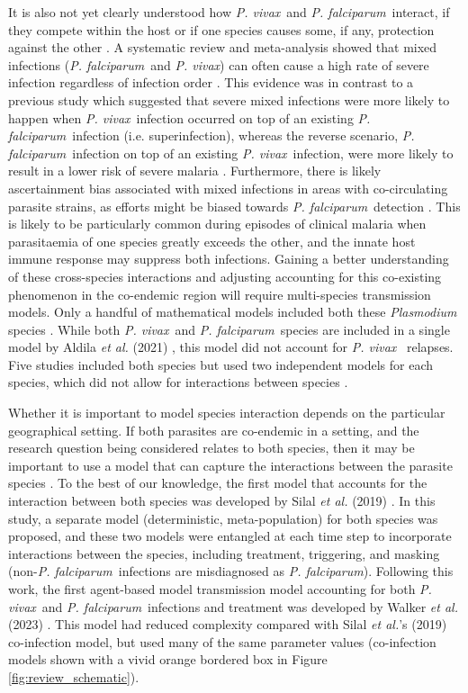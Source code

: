 \documentclass[12pt]{article}
\newcommand{\pv}{\textit{P. vivax}}
\newcommand{\pf}{\textit{P. falciparum}}
\newcommand{\etal}{\textit{et al. }}
\begin{document}
It is also not yet clearly understood how \pv~and \pf~interact, if they compete within the host or if one species causes some, if any, protection against the other \cite{muh2020cross,cox2008knowlesi}.  A systematic review and meta-analysis showed that mixed infections (\pf~and \pv) can often cause a high rate of severe infection regardless of infection order \cite{kotepui2020plasmodium}. This evidence was in contrast to a previous study which suggested that severe mixed infections were more likely to happen when \pv~infection occurred on top of an existing \pf~infection (i.e. superinfection), whereas the reverse scenario, \pf~infection on top of an existing \pv~infection, were more likely to result in a lower risk of severe malaria \cite{mohapatra2012profile}. Furthermore, there is likely ascertainment bias associated with mixed infections in areas with co-circulating parasite strains, as efforts might be biased towards \pf~detection \cite{stresman2020association}. This is likely to be particularly common during episodes of clinical malaria when parasitaemia of one species greatly exceeds the other, and the innate host immune response may suppress both infections. Gaining a better understanding of these cross-species interactions and adjusting accounting for this co-existing phenomenon in the co-endemic region will require multi-species transmission models. Only a handful of mathematical models included both these \textit{Plasmodium} species \cite{pongsumpun2008mathematical,pongsumpun2010impact,aguas2012modeling,pizzitutti2015validated,silal2019malaria,aldila2021superinfection}. While both \pv~and \pf~species are included in a single model by Aldila \etal(2021) \cite{aldila2021superinfection}, this model did not account for \pv~ relapses. Five studies included both species but used two independent models for each species, which did not allow for interactions between species \cite{pongsumpun2008mathematical,pongsumpun2010impact,aguas2012modeling,pizzitutti2015validated,aldila2021superinfection}. 

Whether it is important to model species interaction depends on the particular geographical setting. If both parasites are co-endemic in a setting, and the research question being considered relates to both species, then it may be important to use a model that can capture the interactions between the parasite species \cite{snounou2004co,silal2019malaria,walker2023model}. To the best of our knowledge, the first model that accounts for the interaction between both species was developed by Silal \etal(2019) \cite{silal2019malaria}. In this study, a separate model (deterministic, meta-population) for both species was proposed, and these two models were entangled at each time step to incorporate interactions between the species, including treatment, triggering, and masking (non-\pf~infections are misdiagnosed as \pf).  Following this work, the first agent-based model transmission model accounting for both \pv~and \pf~infections and treatment was developed by Walker \etal(2023) \cite{walker2023model}. This model had reduced complexity compared with Silal \textit{et al.}'s (2019) co-infection model, but used many of the same parameter values \cite{silal2019malaria} (co-infection models shown with a vivid orange bordered box in Figure \ref{fig:review_schematic}). 
\end{document}
